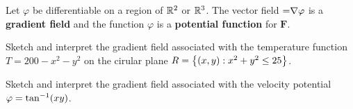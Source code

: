 \documentclass[mathNotesPreamble]{subfiles}
\begin{document}
  \pagebreak

  \begin{defn*}
    Let $\varphi$ be differentiable on a region of $\mathbb{R}^2$ or $\mathbb{R}^3$. The vector field $\mathbf =\nabla \varphi$ is a \textbf{gradient field} and the function $\varphi$ is a \textbf{potential function} for $\mathbf F$.
  \end{defn*}

  \begin{ex*}
    Sketch and interpret the gradient field associated with the temperature function $T=200-x^2-y^2$ on the cirular plane $R={\left\{(x,y): x^2+y^2\leq 25\right\}}$.
  \end{ex*}
  \begin{ex*}
    Sketch and interpret the gradient field associated with the velocity potential $\varphi=\tan^{-1}(xy)$.
  \end{ex*}
  \pagebreak
  
\end{document}
